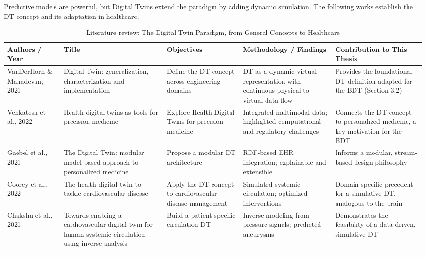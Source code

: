 \documentclass[pdflatex,sn-mathphys-num]{sn-jnl}%
\theoremstyle{thmstyleone}%
\theoremstyle{thmstyletwo}%
\theoremstyle{thmstylethree}%
\begin{document}
Predictive models are powerful, but Digital Twins extend the paradigm by adding dynamic simulation. The following works establish the DT concept and its adaptation in healthcare.

\begin{table}
\caption*{Literature review: The Digital Twin Paradigm, from General Concepts to Healthcare}\label{tabRW2}
\scriptsize
\begin{tabular}{@{}p{0.10\textheight}p{0.17\textheight}p{0.15\textheight}p{0.27\textheight}p{0.18\textheight}@{}}
\toprule
\textbf{Authors / Year} & \textbf{Title} & \textbf{Objectives} & \textbf{Methodology / Findings} & \textbf{Contribution to This Thesis} \\
\midrule
VanDerHorn \& Mahadevan, 2021 \cite{bib5} & Digital Twin: generalization, characterization and implementation & Define the DT concept across engineering domains & DT as a dynamic virtual representation with continuous physical-to-virtual data flow & Provides the foundational DT definition adapted for the BDT (Section 3.2) \\
\addlinespace
Venkatesh et al., 2022 \cite{bib6} & Health digital twins as tools for precision medicine & Explore Health Digital Twins for precision medicine & Integrated multimodal data; highlighted computational and regulatory challenges & Connects the DT concept to personalized medicine, a key motivation for the BDT \\
\addlinespace
Gaebel et al., 2021 \cite{bib7} & The Digital Twin: modular model-based approach to personalized medicine & Propose a modular DT architecture & RDF-based EHR integration; explainable and extensible & Informs a modular, stream-based design philosophy \\
\addlinespace
Coorey et al., 2022 \cite{bib8} & The health digital twin to tackle cardiovascular disease & Apply the DT concept to cardiovascular disease management & Simulated systemic circulation; optimized interventions & Domain-specific precedent for a simulative DT, analogous to the brain \\
\addlinespace
Chakshu et al., 2021 \cite{bib9} & Towards enabling a cardiovascular digital twin for human systemic circulation using inverse analysis & Build a patient-specific circulation DT & Inverse modeling from pressure signals; predicted aneurysms & Demonstrates the feasibility of a data-driven, simulative DT \\
\addlinespace
\botrule
\end{tabular}
\end{table}
\FloatBarrier
\end{document}
